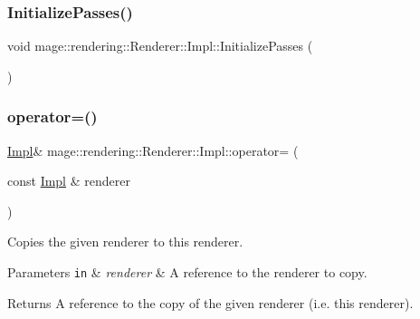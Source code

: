 \subsubsection{\texorpdfstring{Initialize\+Passes()}{InitializePasses()}}
{\footnotesize\ttfamily void mage\+::rendering\+::\+Renderer\+::\+Impl\+::\+Initialize\+Passes (\begin{DoxyParamCaption}{ }\end{DoxyParamCaption})\hspace{0.3cm}{\ttfamily [private]}}

\hypertarget{classmage_1_1rendering_1_1_renderer_1_1_impl_a8eef87ba80c22cba7a2d83db9a740188}{}\label{classmage_1_1rendering_1_1_renderer_1_1_impl_a8eef87ba80c22cba7a2d83db9a740188} 
\subsubsection{\texorpdfstring{operator=()}{operator=()}\hspace{0.1cm}{\footnotesize\ttfamily [1/2]}}
{\footnotesize\ttfamily \hyperlink{classmage_1_1rendering_1_1_renderer_1_1_impl}{Impl}\& mage\+::rendering\+::\+Renderer\+::\+Impl\+::operator= (\begin{DoxyParamCaption}\item[{const \hyperlink{classmage_1_1rendering_1_1_renderer_1_1_impl}{Impl} \&}]{renderer }\end{DoxyParamCaption})\hspace{0.3cm}{\ttfamily [delete]}}

Copies the given renderer to this renderer.


\begin{DoxyParams}[1]{Parameters}
\mbox{\tt in}  & {\em renderer} & A reference to the renderer to copy. \\
\hline
\end{DoxyParams}
\begin{DoxyReturn}{Returns}
A reference to the copy of the given renderer (i.\+e. this renderer). 
\end{DoxyReturn}
\hypertarget{classmage_1_1rendering_1_1_renderer_1_1_impl_a1c40e03347062b200b3e1b214ea7b3ff}{}\label{classmage_1_1rendering_1_1_renderer_1_1_impl_a1c40e03347062b200b3e1b214ea7b3ff} 
